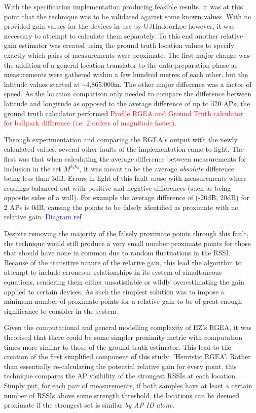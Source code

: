 \documentclass{UoYCSproject}
\begin{document}
            With the specification implementation producing feasible results, it was at this point that the technique was to be validated against some known values. With no provided gain values for the devices in use by UJIIndoorLoc however, it was necessary to attempt to calculate them separately. To this end another relative gain estimator was created using the ground truth location values to specify exactly which pairs of measurements were proximate. The first major change was the addition of a general location translator to the data preparation phase as measurements were gathered within a few hundred metres of each other, but the latitude values started at \textasciitilde4,865,000m. The other major difference was a factor of speed. As the location comparison only needed to compare the difference between latitude and longitude as opposed to the average difference of up to 520 APs, the ground truth calculator performed \textcolor{red}{Profile RGEA and Ground Truth calculator for ballpark difference (i.e. 2 orders of magnitude faster)}.
            
            Through experimentation and comparing the RGEA's output with the newly calculated values, several other faults of the implementation came to light. The first was that when calculating the average difference between measurements for inclusion in the set $M^{k_1k_2}$, it was meant to be the average \emph{absolute} difference being less than 3dB. Errors in light of this fault arose with measurements where readings balanced out with positive and negative differences (such as being opposite sides of a wall). For example the average difference of (-20dB, 20dB) for 2 APs is $0$dB, causing the points to be falsely identified as proximate with no relative gain. \textcolor{blue}{Diagram ref}
            
            Despite removing the majority of the falsely proximate points through this fault, the technique would still produce a very small number proximate points for those that should have none in common due to random fluctuations in the RSSI. Because of the transitive nature of the relative gain, this lead the algorithm to attempt to include erroneous relationships in its system of simultaneous equations, rendering them either unsatisfiable or wildly overestimating the gain applied to certain devices. As such the simplest solution was to impose a minimum number of proximate points for a relative gain to be of great enough significance to consider in the system.
            
            Given the computational and general modelling complexity of EZ's RGEA, it was theorised that there could be some simpler proximity metric with computation times more similar to those of the ground truth estimator. This lead to the creation of the first simplified component of this study: 'Heuristic RGEA'. Rather than essentially re-calculating the potential relative gain for every point, this technique compares the AP visibility of the strongest RSSIs at each location. Simply put, for each pair of measurements, if both samples have at least a certain number of RSSIs above some strength threshold, the locations can be deemed proximate if the strongest set is similar \emph{by AP ID alone}.
            
\end{document}
